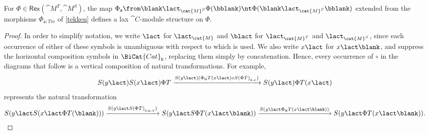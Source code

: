 \begin{lemma}\label{bigdiagrams}
  For \(\Phi \in \mathsf{Rex}(\cat{M}^T,\cat{M}^S)\),
  the map \(\Phi_{\mathsf{a}}\from \blank \lact_{\cat{M}^S} \Phi(\bblank) \nt \Phi(\blank \lact_{\cat{M}^S} \bblank)\)
  extended from the morphisms \(\Phi_{\mathsf{a};Tm}\) of \cref{tekken}
  defines a lax \(\cat{C}\)\hyp{}module structure on \(\Phi\).
\end{lemma}
\begin{proof}
  In order to simplify notation,
  we write \(\lact\) for \(\lact_{\cat{M}}\)
  and \(\blact\) for \(\lact_{\cat{M}^T}\) and \(\lact_{\cat{M}^S}\),
  since each occurrence of either of these symbols is unambiguous with respect to which is used.
  We also write \(x \lact\) for \(x \lact \blank\),
  and suppress the horizontal composition symbols in \(\BiCat{Cat}_{\Bbbk}\),
  replacing them simply by concatenation.
  Hence, every occurrence of \(\circ\) in the diagrams that follow is a vertical composition of natural transformations.
  For example,
  \[
    S(y\lact)S(x\lact)\Phi T
    \xrightarrow{S(y\lact)(\Phi_{\mathsf{la}}T(x\lact) \circ S{(\Phi T)}_{\mathsf{a}, x})}
    S(y\lact)\Phi T(x \lact)
  \]
  represents the natural transformation
  \[
    S(y \lact S(x \lact \Phi T(\blank)))
    \xrightarrow{S(y \lact S{(\Phi T)}_{\mathsf{a}; y, x})}
    S(y \lact S \Phi T (x \lact \blank))
    \xrightarrow{S(y \lact \Phi_{\mathsf{la}}T(x \lact \blank))}
    S(y \lact \Phi T (x \lact \blank)).
  \]


\end{proof}
